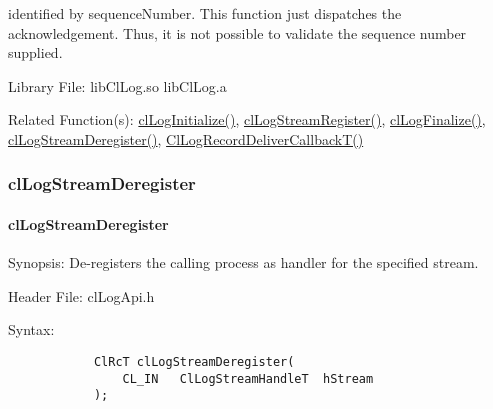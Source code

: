 \begin{flushleft}
\begin{Desc}
identified by sequenceNumber. This function just dispatches the acknowledgement. Thus, it is not possible to validate the sequence number supplied.
\end{Desc}
\begin{Desc}
\item[Library File:] libClLog.so
\newline
libClLog.a
\end{Desc}
\begin{Desc}
\item[Related Function(s):]\hyperlink{pagelog101}{clLogInitialize()}, \hyperlink{pagelog112}{clLogStreamRegister()},
\hyperlink{pagelog102}{clLogFinalize()}, \hyperlink{pagelog115}{clLogStreamDeregister()}, \hyperlink{pagelog113}{ClLogRecordDeliverCallbackT()}
\end{Desc}
\newpage


\subsubsection{clLogStreamDeregister}
\hypertarget{pagelog115}{}\paragraph{cl\-Log\-Stream\-Deregister}\label{pagelog115}
\begin{Desc}
\item[Synopsis:] De-registers the calling process as handler for the specified stream.\end{Desc}
\begin{Desc}
\item[Header File:] clLogApi.h \end{Desc}
\begin{Desc}
\item[Syntax:]
\footnotesize\begin{verbatim}        	
			ClRcT clLogStreamDeregister(
				CL_IN	ClLogStreamHandleT	hStream
			);


\end{verbatim}
\end{Desc}
\end{flushleft}
